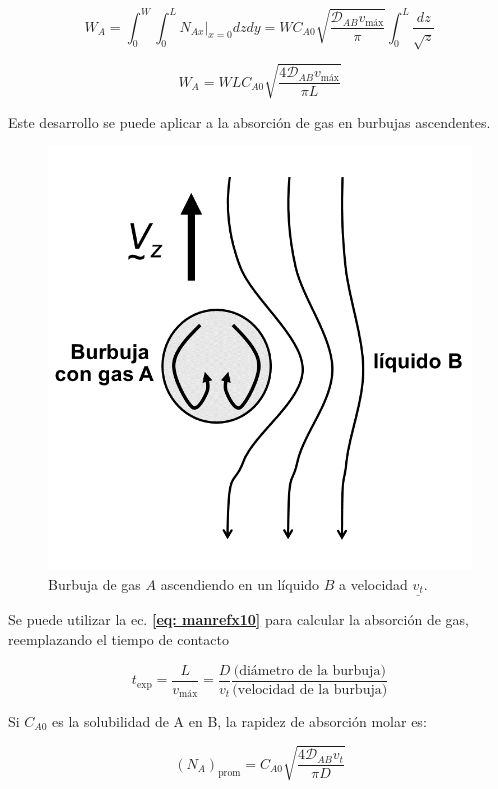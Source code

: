  $$W_A = \int_0^W \int_0^L N_{Ax}|_{x=0} dz dy = WC_{A0} \sqrt{\frac{\mathscr{D}_{AB} v_{\text{máx}}}{\pi}} \int_0^L \frac{dz}{\sqrt{z}}$$
 
 \begin{equation} \label{eq: manrefx10}
 W_A = WLC_{A0} \sqrt{\frac{4\mathscr{D}_{AB} v_{\text{máx}}}{\pi L}}
 \end{equation}
 
 Este desarrollo se puede aplicar a la absorción de gas en burbujas ascendentes.
 
 \begin{figure}[H]
 	\centering
 	\includegraphics[scale=0.2]{./Capitulo2/Imagenes/fig-2-6.PNG}
 	\caption{Burbuja de gas $A$ ascendiendo en un líquido $B$ a velocidad $\underline{v_t}$.}
 \end{figure}
 
 Se puede utilizar la ec. \textbf{\eqref{eq: manrefx10}} para calcular la absorción de gas, reemplazando el tiempo de contacto 
 
 $$t_{\text{exp}} = \frac{L}{v_{\text{máx}}} = \frac{D}{v_t} \frac{\text{(diámetro de la burbuja)}}{\text{(velocidad de la burbuja)}}$$
 
 Si $C_{A0}$ es la solubilidad de A en B, la rapidez de absorción molar es:
 
 \begin{equation}
 	(N_A)_{\text{prom}} = C_{A0} \sqrt{\frac{4 \mathscr{D}_{AB} v_t}{\pi D}}
 \end{equation}
 
